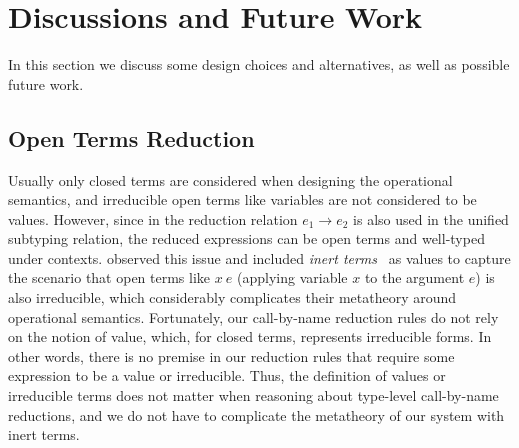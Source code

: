 \section{Discussions and Future Work}

In this section we discuss some design choices and alternatives, as well
as possible future work.

\subsection{Open Terms Reduction}
\label{sec:open-term-reduction}

Usually only closed terms are considered when designing the operational semantics,
and irreducible open terms like variables are not considered to be values.
However, since in \name the reduction relation $e_1 \longrightarrow e_2$ is also
used in the unified subtyping relation, the reduced expressions can be open terms and well-typed under contexts.
\citet{full} observed this issue and included \emph{inert terms}~\cite{opencbv} as values
to capture the scenario that open terms like $x~e$
(applying variable $x$ to the argument $e$) is also irreducible, which considerably
complicates their metatheory around operational semantics.
Fortunately, our call-by-name reduction rules do not rely on the notion of value,
which, for closed terms, represents irreducible forms.
In other words, there is no premise in our reduction rules that require
some expression to be a value or irreducible.
Thus, the definition of values or irreducible terms does not matter when reasoning about
type-level call-by-name reductions, and we do not have to complicate the metatheory of our system
with inert terms.


